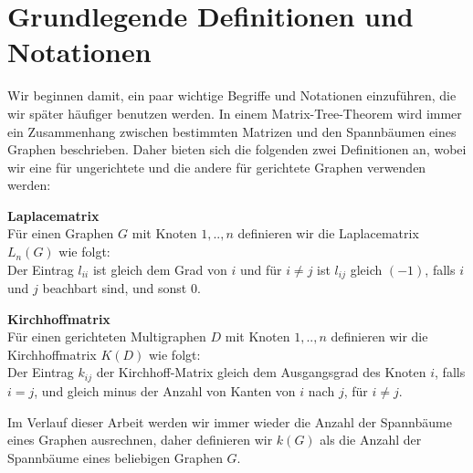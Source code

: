\section{Grundlegende Definitionen und Notationen}
Wir beginnen damit, ein paar wichtige Begriffe und Notationen einzuführen, die wir später häufiger benutzen werden.
In einem Matrix-Tree-Theorem wird immer ein Zusammenhang zwischen bestimmten Matrizen und den Spannbäumen eines Graphen beschrieben. Daher bieten sich die folgenden zwei Definitionen an, wobei wir eine für ungerichtete und die andere für gerichtete Graphen verwenden werden:
\begin{Df}\textbf{Laplacematrix}\\
Für einen Graphen $G$ mit Knoten $1,..,n$ definieren wir die Laplacematrix $L_n(G)$ wie folgt:\\
Der Eintrag $l_{ii}$ ist gleich dem Grad von $i$ und für $i \neq j$ ist $l_{ij}$ gleich $(-1)$, falls $i$ und $j$ beachbart sind, und sonst $0$.
\end{Df}
\begin{Df}\textbf{Kirchhoffmatrix}\\
 Für einen gerichteten Multigraphen $D$ mit Knoten $1,..,n$ definieren wir die Kirchhoffmatrix $K(D)$ wie folgt:\\
 Der Eintrag $k_{ij}$ der Kirchhoff-Matrix gleich dem Ausgangsgrad des Knoten $i$, falls $i=j$, und gleich minus der Anzahl von Kanten von $i$ nach $j$, für $i \neq j$.
\end{Df}
Im Verlauf dieser Arbeit werden wir immer wieder die Anzahl der Spannbäume eines Graphen ausrechnen, daher definieren wir $\mathit{k}(G)$ als die Anzahl der Spannbäume eines beliebigen Graphen $G$.
